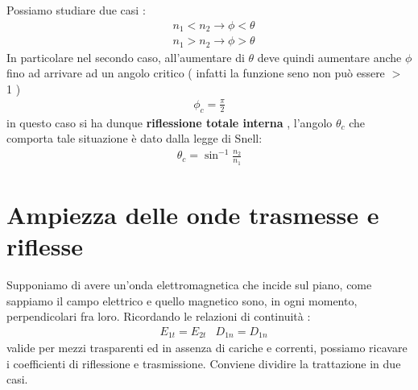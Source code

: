 Possiamo studiare due casi : 
\begin{align*}
    &n_{1}<n_{2} \rightarrow \phi<\theta\\
    &n_{1}>n_{2} \rightarrow \phi>\theta
\end{align*}
In particolare nel secondo caso, all'aumentare di $\theta$ deve quindi aumentare anche $\phi$ 
fino ad arrivare ad un angolo critico ( infatti la funzione seno non può essere $>$ 1 )
\begin{align*}
    \phi_{c} = \frac{\pi}{2}
\end{align*}
in questo caso si ha dunque \textbf{riflessione totale interna }, l'angolo $\theta_{c}$ che 
comporta tale situazione è dato dalla legge di Snell:
\begin{align*}
    \theta_{c} = \sin^{-1}{\frac{n_{2}}{n_{1}}}
\end{align*}
\section{Ampiezza delle onde trasmesse e riflesse}
Supponiamo di avere un'onda elettromagnetica che incide sul piano, come sappiamo il campo 
elettrico e quello magnetico sono, in ogni momento, perpendicolari fra loro.
Ricordando le relazioni di continuità :
\begin{align*}
    &E_{1t} = E_{2t}  & D_{1n}=D_{1n}
\end{align*}
valide per mezzi trasparenti ed in assenza di cariche e correnti, possiamo ricavare i coefficienti di 
riflessione e trasmissione. 
Conviene dividire la trattazione in due casi.
\newpage
